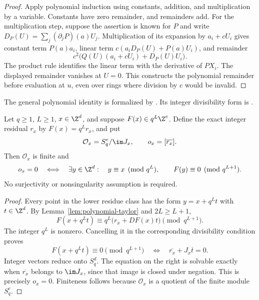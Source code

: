 \begin{proof}
Apply polynomial induction using constants, addition, and multiplication by a
variable. Constants have zero remainder, and remainders add. For the
multiplication step, suppose the assertion is known for $P$ and write
$D_P(U)=\sum_j(\partial_jP)(a)U_j$. Multiplication of its expansion by
$a_i+cU_i$ gives constant term $P(a)a_i$, linear term
$c(a_iD_P(U)+P(a)U_i)$, and remainder
\[
 c^2\bigl(Q(U)(a_i+cU_i)+D_P(U)U_i\bigr).
\]
The product rule identifies the linear term with the derivative of
$PX_i$. The displayed remainder vanishes at $U=0$. This constructs the
polynomial remainder before evaluation at $u$, even over rings where
division by $c$ would be invalid.
\end{proof}

The general polynomial identity is formalized by
.
Its integer divisibility form is
.

\begin{theorem}\label{thm:finite-polynomial-obstruction}
Let $q\ge1$, $L\ge1$, $x\in\Z^d$, and suppose
$F(x)\in q^L\Z^e$. Define the exact integer residual $r_x$ by
$F(x)=q^Lr_x$, and put
\[
 \mathcal O_x=S_q^e/\im J_x,\qquad o_x=[\overline{r_x}].
\]
Then $\mathcal O_x$ is finite and
\begin{equation}\label{eq:finite-obstruction}
 o_x=0\quad\Longleftrightarrow\quad
 \exists y\in\Z^d:\quad
 y\equiv x\pmod{q^L},\qquad F(y)\equiv0\pmod{q^{L+1}}.
\end{equation}
No surjectivity or nonsingularity assumption is required.
\end{theorem}

\begin{proof}
Every point in the lower residue class has the form $y=x+q^Lt$ with
$t\in\Z^d$. By Lemma~\ref{lem:polynomial-taylor} and $2L\ge L+1$,
\[
 F(x+q^Lt)\equiv q^L\bigl(r_x+DF(x)t\bigr)\pmod{q^{L+1}}.
\]
The integer $q^L$ is nonzero. Cancelling it in the corresponding divisibility
condition proves
\begin{equation}\label{eq:digit-correction}
 F(x+q^Lt)\equiv0\pmod{q^{L+1}}
 \quad\Longleftrightarrow\quad
 \overline{r_x}+J_x\overline t=0.
\end{equation}
Integer vectors reduce onto $S_q^d$. The equation on the right is solvable
exactly when $\overline{r_x}$ belongs to $\im J_x$, since that image is
closed under negation. This is precisely $o_x=0$. Finiteness follows because
$\mathcal O_x$ is a quotient of the finite module $S_q^e$.
\end{proof}

